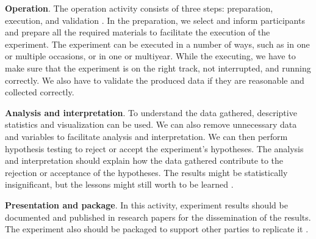 \textbf{Operation}. The operation activity consists of three steps: preparation, execution, and validation \cite{DBLP:books/daglib/0029933/Wohlin}. 
In the preparation, we select and inform participants and prepare all the required materials to facilitate the execution of the experiment. The experiment can be executed in a number of ways, such as in one or multiple occasions, or in one or multiyear.  While the executing, we have to make sure that the experiment is on the right track, not interrupted, and running correctly. We also have to validate the produced data if they are reasonable and collected correctly. 

\textbf{Analysis and interpretation}.
To understand the data gathered, descriptive statistics and visualization can be used. We can also remove unnecessary data and variables to facilitate analysis and interpretation. We can then perform hypothesis testing to reject or accept the experiment's hypotheses. The analysis and interpretation should explain how the data gathered contribute to the rejection or acceptance of the hypotheses. The results might be statistically insignificant, but the lessons might still worth to be learned \cite{DBLP:books/daglib/0029933/Wohlin}. 

\textbf{Presentation and package}. In this activity, experiment results should be documented and published in research papers for the dissemination of the results. The experiment also should be packaged to support other parties to replicate it \cite{DBLP:books/daglib/0029933/Wohlin}. 
